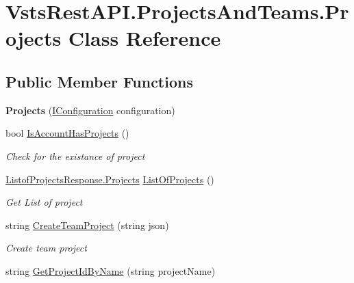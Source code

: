 \hypertarget{class_vsts_rest_a_p_i_1_1_projects_and_teams_1_1_projects}{}\section{Vsts\+Rest\+A\+P\+I.\+Projects\+And\+Teams.\+Projects Class Reference}
\label{class_vsts_rest_a_p_i_1_1_projects_and_teams_1_1_projects}
\subsection*{Public Member Functions}
\begin{DoxyCompactItemize}
\item 
\mbox{\label{class_vsts_rest_a_p_i_1_1_projects_and_teams_1_1_projects_ab4361982eb517567e884317df447132f}} 
{\bfseries Projects} (\mbox{\hyperlink{interface_vsts_rest_a_p_i_1_1_i_configuration}{I\+Configuration}} configuration)
\item 
bool \mbox{\hyperlink{class_vsts_rest_a_p_i_1_1_projects_and_teams_1_1_projects_a5972180d08f6a32c0a22c03f94622904}{Is\+Account\+Has\+Projects}} ()
\begin{DoxyCompactList}\small\item\em Check for the existance of project \end{DoxyCompactList}\item 
\mbox{\hyperlink{class_vsts_rest_a_p_i_1_1_viewmodel_1_1_project_and_teams_1_1_listof_projects_response_1_1_projects}{Listof\+Projects\+Response.\+Projects}} \mbox{\hyperlink{class_vsts_rest_a_p_i_1_1_projects_and_teams_1_1_projects_afd4729308614a2d4f4124c7eedafecfc}{List\+Of\+Projects}} ()
\begin{DoxyCompactList}\small\item\em Get List of project \end{DoxyCompactList}\item 
string \mbox{\hyperlink{class_vsts_rest_a_p_i_1_1_projects_and_teams_1_1_projects_a2dc9bc6f325831b4f86c91cdfbd2bcc9}{Create\+Team\+Project}} (string json)
\begin{DoxyCompactList}\small\item\em Create team project \end{DoxyCompactList}\item 
string \mbox{\hyperlink{class_vsts_rest_a_p_i_1_1_projects_and_teams_1_1_projects_a488712df438d066911a1065f15556cbc}{Get\+Project\+Id\+By\+Name}} (string project\+Name)

\end{DoxyCompactItemize}
